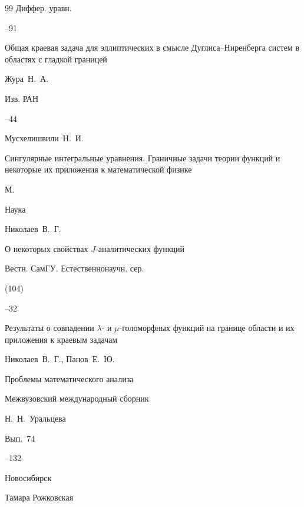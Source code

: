 \begin{thebibliography}{99}
\jour Диффер. уравн.




--91







\paper Общая краевая задача для эллиптических в смысле Дуглиса--Ниренберга систем в областях с гладкой границей

\by  Жура~Н.~А.

\jour Изв. РАН




--44





\by Мусхелишвили~Н.~И.

\book Сингулярные интегральные уравнения. Граничные задачи теории функций и некоторые их приложения к математической физике

\publaddr М.

\publ Наука







\by Николаев~В.~Г.

\paper О некоторых  свойствах $J$-аналитических функций

\jour Вестн. СамГУ. Естественнонаучн. сер.


(104)

--32





\paper Результаты о совпадении $\lambda$-   и $\mu$-голоморфных функций на границе области и    их приложения к краевым задачам

\by   Николаев~В.~Г., Панов~Е.~Ю.

\inbook Проблемы математического  анализа

\bookinfo Межвузовский международный сборник 

\eds Н.~Н.~Уральцева


\volinfo Вып.~74

--132

\publaddr Новосибирск 

\publ Тамара Рожковская





\end{thebibliography}
